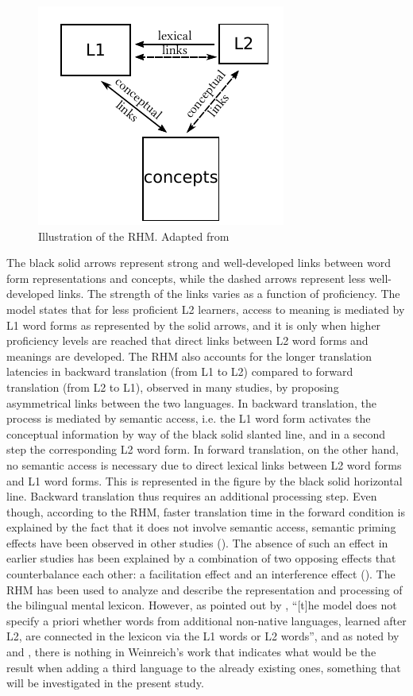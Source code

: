 \documentclass[output=paper,colorlinks,citecolor=brown,nonflat]{langsci/langscibook}
\begin{document}
\begin{figure}
    \includegraphics[height=.3\textheight]{figures/Gudmundson-fig1mod.pdf}
    \caption{Illustration of the RHM. Adapted from \citet{KrollStewart1994}}
    \label{fig:gudmundson:1}
\end{figure}

The black solid arrows represent strong and well-developed links between word form representations and concepts, while the dashed arrows represent less well-developed links. The strength of the links varies as a function of proficiency. The model states that for less proficient L2 learners, access to meaning is mediated by L1 word forms as represented by the solid arrows, and it is only when higher proficiency levels are reached that direct links between L2 word forms and meanings are developed. The RHM also accounts for the longer translation latencies in backward translation (from L1 to L2) compared to forward translation (from L2 to L1), observed in many studies, by proposing asymmetrical links between the two languages. In backward translation, the process is mediated by semantic access, i.e. the L1 word form activates the conceptual information by way of the black solid slanted line, and in a second step the corresponding L2 word form. In forward translation, on the other hand, no semantic access is necessary due to direct lexical links between L2 word forms and L1 word forms. This is represented in the figure by the black solid horizontal line. Backward translation thus requires an additional processing step. Even though, according to the RHM, faster translation time in the forward condition is explained by the fact that it does not involve semantic access, semantic priming effects have been observed in other studies (\citealt{DuyckBrysbaert2002, SchoonbaertEtAl2009}). The absence of such an effect in earlier studies has been explained by a combination of two opposing effects that counterbalance each other: a facilitation effect and an interference effect (\citealt{WuJuffs2019}). The RHM has been used to analyze and describe the representation and processing of the bilingual mental lexicon. However, as pointed out by \citet[236]{GoralEtAl2006}, “[t]he model does not specify a priori whether words from additional non-native languages, learned after L2, are connected in the lexicon via the L1 words or L2 words”, and as noted by \citet{Singleton2003} and \citet{DeAngelis2007}, there is nothing in Weinreich’s work that indicates what would be the result when adding a third language to the already existing ones, something that will be investigated in the present study.
\end{document}
